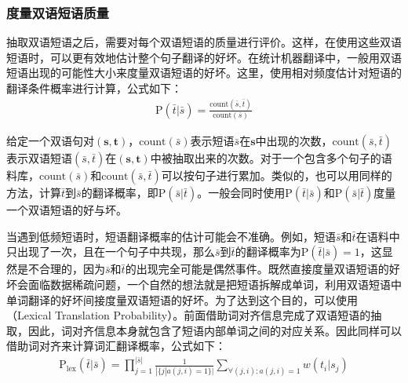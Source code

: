 
\subsubsection{度量双语短语质量}

\parinterval 抽取双语短语之后，需要对每个双语短语的质量进行评价。这样，在使用这些双语短语时，可以更有效地估计整个句子翻译的好坏。在统计机器翻译中，一般用双语短语出现的可能性大小来度量双语短语的好坏。这里，使用相对频度估计对短语的翻译条件概率进行计算，公式如下：
\begin{eqnarray}
\textrm{P}(\bar{t}|\bar{s}) = \frac{\textrm{count}(\bar{s},\bar{t})}{\textrm{count}(\bar{s})}
\label{eq:4-13}
\end{eqnarray}

\parinterval 给定一个双语句对$(\mathbf{s},\mathbf{t})$，$\textrm{count}(\bar{s})$表示短语$\bar{s}$在$\mathbf{s}$中出现的次数，$\textrm{count}(\bar{s},\bar{t})$表示双语短语$(\bar{s},\bar{t})$在$(\mathbf{s},\mathbf{t})$中被抽取出来的次数。对于一个包含多个句子的语料库，$\textrm{count}(\bar{s})$和$\textrm{count}(\bar{s},\bar{t})$可以按句子进行累加。类似的，也可以用同样的方法，计算$\bar{t}$到$\bar{s}$的翻译概率，即$\textrm{P}(\bar{s}|\bar{t})$。一般会同时使用$\textrm{P}(\bar{t}|\bar{s})$和$\textrm{P}(\bar{s}|\bar{t})$度量一个双语短语的好与坏。

\parinterval 当遇到低频短语时，短语翻译概率的估计可能会不准确。例如，短语$\bar{s}$和$\bar{t}$在语料中只出现了一次，且在一个句子中共现，那么$\bar{s}$到$\bar{t}$的翻译概率为$\textrm{P}(\bar{t}|\bar{s})=1$，这显然是不合理的，因为$\bar{s}$和$\bar{t}$的出现完全可能是偶然事件。既然直接度量双语短语的好坏会面临数据稀疏问题，一个自然的想法就是把短语拆解成单词，利用双语短语中单词翻译的好坏间接度量双语短语的好坏。为了达到这个目的，可以使用{\small{}}（Lexical Translation Probability）。前面借助词对齐信息完成了双语短语的抽取，因此，词对齐信息本身就包含了短语内部单词之间的对应关系。因此同样可以借助词对齐来计算词汇翻译概率，公式如下：
\begin{eqnarray}
\textrm{$\textrm{P}_{\textrm{lex}}$}(\bar{t}|\bar{s}) = \prod_{j=1}^{|\bar{s}|} \frac{1}{|\{j|a(j,i) = 1\}|} \sum_{\forall(j,i):a(j,i) = 1} w(t_i|s_j)
\label{eq:4-14}
\end{eqnarray}

